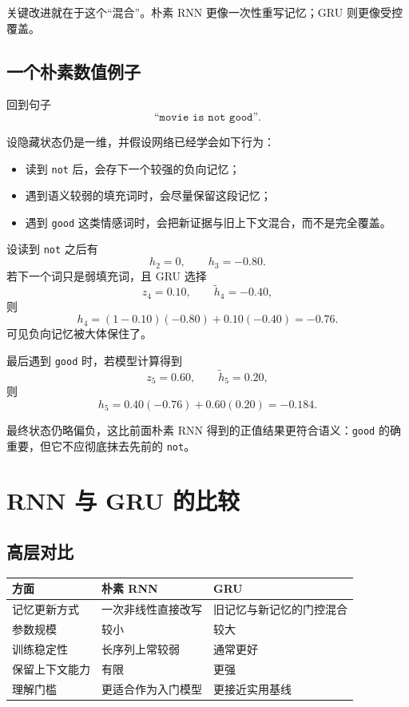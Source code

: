 \documentclass[12pt,a4paper]{ctexart}
\begin{document}
关键改进就在于这个“混合”。朴素 RNN 更像一次性重写记忆；GRU 则更像受控覆盖。

\subsection{一个朴素数值例子}

回到句子
\[
\texttt{``movie is not good''}.
\]

设隐藏状态仍是一维，并假设网络已经学会如下行为：
\begin{itemize}
  \item 读到 \texttt{not} 后，会存下一个较强的负向记忆；
  \item 遇到语义较弱的填充词时，会尽量保留这段记忆；
  \item 遇到 \texttt{good} 这类情感词时，会把新证据与旧上下文混合，而不是完全覆盖。
\end{itemize}

设读到 \texttt{not} 之后有
\[
h_2 = 0,\qquad
h_3 = -0.80.
\]
若下一个词只是弱填充词，且 GRU 选择
\[
z_4 = 0.10,\qquad
\tilde{h}_4 = -0.40,
\]
则
\[
h_4 = (1-0.10)(-0.80) + 0.10(-0.40) = -0.76.
\]
可见负向记忆被大体保住了。

最后遇到 \texttt{good} 时，若模型计算得到
\[
z_5 = 0.60,\qquad
\tilde{h}_5 = 0.20,
\]
则
\[
h_5 = 0.40(-0.76) + 0.60(0.20) = -0.184.
\]

最终状态仍略偏负，这比前面朴素 RNN 得到的正值结果更符合语义：\texttt{good} 的确重要，但它不应彻底抹去先前的 \texttt{not}。

\section{RNN 与 GRU 的比较}

\subsection{高层对比}

\begin{center}
\begin{tabular}{p{3.2cm}p{5.1cm}p{5.1cm}}
\toprule
方面 & 朴素 RNN & GRU \\
\midrule
记忆更新方式 & 一次非线性直接改写 & 旧记忆与新记忆的门控混合 \\
参数规模 & 较小 & 较大 \\
训练稳定性 & 长序列上常较弱 & 通常更好 \\
保留上下文能力 & 有限 & 更强 \\
理解门槛 & 更适合作为入门模型 & 更接近实用基线 \\
\bottomrule
\end{tabular}
\end{center}
\end{document}
